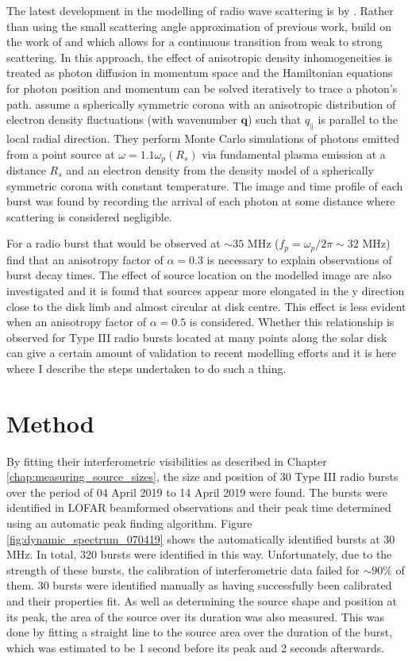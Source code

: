 The latest development in the modelling of radio wave scattering is by \cite{Kontar2019}. Rather than using the small scattering angle approximation of previous work, \cite{Kontar2019} build on the work of \cite{Arzner1999} and \cite{Bian2019} which allows for a continuous transition from weak to strong scattering. In this approach, the effect of anisotropic density inhomogeneities is treated as photon diffusion in momentum space and the Hamiltonian equations for photon position and momentum can be solved iteratively to trace a photon's path. \cite{Kontar2019} assume a spherically symmetric corona with an anisotropic distribution of electron density fluctuations (with wavenumber $\mathbf{q}$) such that $q_\parallel$ is parallel to the local radial direction. They perform Monte Carlo simulations of photons emitted from a point source at $\omega = 1.1 \omega_p(R_s)$ via fundamental plasma emission at a distance $R_s$ and an electron density from the \cite{Parker1960} density model of a spherically symmetric corona with constant temperature. The image and time profile of each burst was found by recording the arrival of each photon at some distance where scattering is considered negligible.

For a radio burst that would be observed at $\sim 35$ MHz ($f_p = \omega_p/2 \pi \sim 32$ MHz) \cite{Kontar2019} find that an anisotropy factor of $\alpha = 0.3$ is necessary to explain observations of burst decay times.  The effect of source location on the modelled image are also investigated and it is found that sources appear more elongated in the y direction close to the disk limb and almost circular at disk centre.  This effect is less evident when an anisotropy factor of $\alpha = 0.5$ is considered. Whether this relationship is observed for Type III radio bursts located at many points along the solar disk can give a certain amount of validation to recent modelling efforts and it is here where I describe the steps undertaken to do such a thing.

\section{Method}
\label{sec:obsvtheory_method}
By fitting their interferometric visibilities as described in Chapter \ref{chap:measuring_source_sizes}, the size and position of 30 Type III radio bursts over the period of 04 April 2019 to 14 April 2019 were found. The bursts were identified in LOFAR beamformed observations and their peak time determined using an automatic peak finding algorithm. Figure \ref{fig:dynamic_spectrum_070419} shows the automatically identified bursts at 30 MHz. In total, 320 bursts were identified in this way. Unfortunately, due to the strength of these bursts, the calibration of interferometric data failed for $\sim 90 \%$ of them. 30 bursts were identified manually as having successfully been calibrated and their properties fit. As well as determining the source shape and position at its peak, the area of the source over its duration was also measured. This was done by fitting a straight line to the source area over the duration of the burst, which was estimated to be 1 second before its peak and 2 seconds afterwards.

